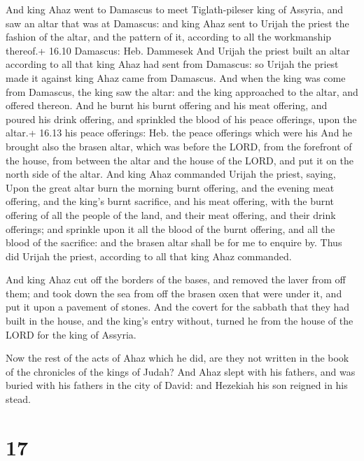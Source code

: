  And king Ahaz went to Damascus to meet Tiglath-pileser
king of Assyria, and saw an altar that was at Damascus: and king Ahaz
sent to Urijah the priest the fashion of the altar, and the pattern of
it, according to all the workmanship thereof.+ 16.10 Damascus: Heb.
Dammesek  And Urijah the priest built an altar according to
all that king Ahaz had sent from Damascus: so Urijah the priest made it
against king Ahaz came from Damascus.  And when the king
was come from Damascus, the king saw the altar: and the king approached
to the altar, and offered thereon.  And he burnt his burnt
offering and his meat offering, and poured his drink offering, and
sprinkled the blood of his peace offerings, upon the altar.+ 16.13 his
peace offerings: Heb. the peace offerings which were his 
And he brought also the brasen altar, which was before the LORD, from
the forefront of the house, from between the altar and the house of the
LORD, and put it on the north side of the altar.  And king
Ahaz commanded Urijah the priest, saying, Upon the great altar burn the
morning burnt offering, and the evening meat offering, and the king's
burnt sacrifice, and his meat offering, with the burnt offering of all
the people of the land, and their meat offering, and their drink
offerings; and sprinkle upon it all the blood of the burnt offering, and
all the blood of the sacrifice: and the brasen altar shall be for me to
enquire by.  Thus did Urijah the priest, according to all
that king Ahaz commanded.

 And king Ahaz cut off the borders of the bases, and
removed the laver from off them; and took down the sea from off the
brasen oxen that were under it, and put it upon a pavement of stones.
 And the covert for the sabbath that they had built in the
house, and the king's entry without, turned he from the house of the
LORD for the king of Assyria.

 Now the rest of the acts of Ahaz which he did, are they
not written in the book of the chronicles of the kings of Judah?
 And Ahaz slept with his fathers, and was buried with his
fathers in the city of David: and Hezekiah his son reigned in his stead.

\hypertarget{section-16}{%
\section{17}\label{section-16}}

